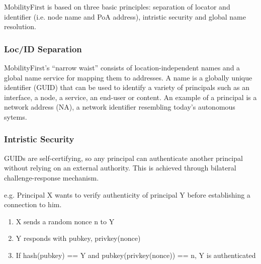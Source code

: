             MobilityFirst is based on three basic principles: separation of locator and identifier (i.e. node name and PoA address), intristic security and global name resolution.

            \subsubsection{Loc/ID Separation}

                MobilityFirst's ``narrow waist'' consists of location-independent names and a global name service for mapping them to addresses. A name is a globally unique identifier (GUID) that can be used to identify a variety of principals such as an interface, a node, a service, an end-user or content. An example of a principal is a network address (NA), a network identifier resembling today's autonomous sytems.

            \subsubsection{Intristic Security}

                GUIDs are self-certifying, so any principal can authenticate another principal without relying on an external authority. This is achieved through bilateral challenge-response mechanism.

                e.g. Principal X wants to verify authenticity of principal Y before establishing a connection to him.
                \begin{enumerate}
                    \item X sends a random nonce n to Y
                    \item Y responds with {pubkey, privkey(nonce)}
                    \item If hash(pubkey) == Y and pubkey(privkey(nonce)) == n, Y is authenticated
                \end{enumerate}


